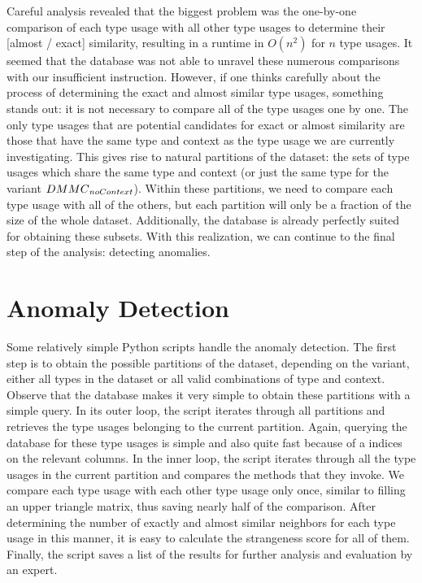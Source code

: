 Careful analysis revealed that the biggest problem was the one-by-one comparison of each type usage with all other type usages to determine their [almost / exact] similarity, resulting in a runtime in $O(n^2)$ for $n$ type usages.
It seemed that the database was not able to unravel these numerous comparisons with our insufficient instruction.
However, if one thinks carefully about the process of determining the exact and almost similar type usages, something stands out: it is not necessary to compare all of the type usages one by one.
The only type usages that are potential candidates for exact or almost similarity are those that have the same type and context as the type usage we are currently investigating.
This gives rise to natural partitions of the dataset: the sets of type usages which share the same type and context (or just the same type for the variant $\mathnormal{DMMC}_\mathnormal{noContext}$).
Within these partitions, we need to compare each type usage with all of the others, but each partition will only be a fraction of the size of the whole dataset.
Additionally, the database is already perfectly suited for obtaining these subsets.
With this realization, we can continue to the final step of the analysis: detecting anomalies.

\section{Anomaly Detection}\label{sec:anomaly}


Some relatively simple Python scripts handle the anomaly detection.
The first step is to obtain the possible partitions of the dataset, depending on the variant, either all types in the dataset or all valid combinations of type and context.
Observe that the database makes it very simple to obtain these partitions with a simple query.
In its outer loop, the script iterates through all partitions and retrieves the type usages belonging to the current partition.
Again, querying the database for these type usages is simple and also quite fast because of a indices on the relevant columns.
In the inner loop, the script iterates through all the type usages in the current partition and compares the methods that they invoke.
We compare each type usage with each other type usage only once, similar to filling an upper triangle matrix, thus saving nearly half of the comparison.
After determining the number of exactly and almost similar neighbors for each type usage in this manner, it is easy to calculate the strangeness score for all of them.
Finally, the script saves a list of the results for further analysis and evaluation by an expert.

